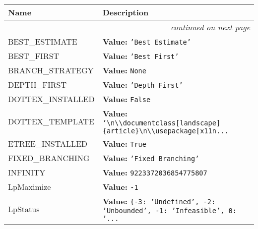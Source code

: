     \vspace{-1cm}
\hspace{\varindent}\begin{longtable}{|p{\varnamewidth}|p{\vardescrwidth}|l}
\cline{1-2}
\cline{1-2} \centering \textbf{Name} & \centering \textbf{Description}& \\
\cline{1-2}
\endhead\cline{1-2}\multicolumn{3}{r}{\small\textit{continued on next page}}\\\endfoot\cline{1-2}
\endlastfoot\raggedright B\-E\-S\-T\-\_\-E\-S\-T\-I\-M\-A\-T\-E\- & \raggedright \textbf{Value:} 
{\tt \texttt{'}\texttt{Best Estimate}\texttt{'}}&\\
\cline{1-2}
\raggedright B\-E\-S\-T\-\_\-F\-I\-R\-S\-T\- & \raggedright \textbf{Value:} 
{\tt \texttt{'}\texttt{Best First}\texttt{'}}&\\
\cline{1-2}
\raggedright B\-R\-A\-N\-C\-H\-\_\-S\-T\-R\-A\-T\-E\-G\-Y\- & \raggedright \textbf{Value:} 
{\tt None}&\\
\cline{1-2}
\raggedright D\-E\-P\-T\-H\-\_\-F\-I\-R\-S\-T\- & \raggedright \textbf{Value:} 
{\tt \texttt{'}\texttt{Depth First}\texttt{'}}&\\
\cline{1-2}
\raggedright D\-O\-T\-2\-T\-E\-X\-\_\-I\-N\-S\-T\-A\-L\-L\-E\-D\- & \raggedright \textbf{Value:} 
{\tt False}&\\
\cline{1-2}
\raggedright D\-O\-T\-2\-T\-E\-X\-\_\-T\-E\-M\-P\-L\-A\-T\-E\- & \raggedright \textbf{Value:} 
{\tt \texttt{'}\texttt{{\textbackslash}n{\textbackslash}{\textbackslash}documentclass[landscape]\{article\}{\textbackslash}n{\textbackslash}{\textbackslash}usepackage[x11n}\texttt{...}}&\\
\cline{1-2}
\raggedright E\-T\-R\-E\-E\-\_\-I\-N\-S\-T\-A\-L\-L\-E\-D\- & \raggedright \textbf{Value:} 
{\tt True}&\\
\cline{1-2}
\raggedright F\-I\-X\-E\-D\-\_\-B\-R\-A\-N\-C\-H\-I\-N\-G\- & \raggedright \textbf{Value:} 
{\tt \texttt{'}\texttt{Fixed Branching}\texttt{'}}&\\
\cline{1-2}
\raggedright I\-N\-F\-I\-N\-I\-T\-Y\- & \raggedright \textbf{Value:} 
{\tt 9223372036854775807}&\\
\cline{1-2}
\raggedright L\-p\-M\-a\-x\-i\-m\-i\-z\-e\- & \raggedright \textbf{Value:} 
{\tt -1}&\\
\cline{1-2}
\raggedright L\-p\-S\-t\-a\-t\-u\-s\- & \raggedright \textbf{Value:} 
{\tt \texttt{\{}-3\texttt{: }\texttt{'}\texttt{Undefined}\texttt{'}\texttt{, }-2\texttt{: }\texttt{'}\texttt{Unbounded}\texttt{'}\texttt{, }-1\texttt{: }\texttt{'}\texttt{Infeasible}\texttt{'}\texttt{, }0\texttt{: }\texttt{'}\texttt{...}}&\\

\end{longtable}
